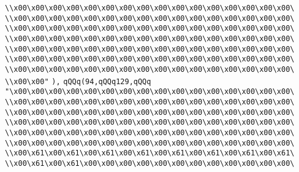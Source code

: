 \verb|\\x00\x00\x00\x00\x00\x00\x00\x00\x00\x00\x00\x00\x00\x00\x00\x00\|\newline
\verb|\\x00\x00\x00\x00\x00\x00\x00\x00\x00\x00\x00\x00\x00\x00\x00\x00\|\newline
\verb|\\x00\x00\x00\x00\x00\x00\x00\x00\x00\x00\x00\x00\x00\x00\x00\x00\|\newline
\verb|\\x00\x00\x00\x00\x00\x00\x00\x00\x00\x00\x00\x00\x00\x00\x00\x00\|\newline
\verb|\\x00\x00\x00\x00\x00\x00\x00\x00\x00\x00\x00\x00\x00\x00\x00\x00\|\newline
\verb|\\x00\x00\x00\x00\x00\x00\x00\x00\x00\x00\x00\x00\x00\x00\x00\x00\|\newline
\verb|\\x00\x00\x00\x00\x00\x00\x00\x00\x00\x00\x00\x00\x00\x00\x00\x00\|\newline
\verb|\\x00\x00"|\newline
\verb|),|\newline
\verb|qQQq(94,qQQq129,qQQq|\newline
\verb|"\x00\x00\x00\x00\x00\x00\x00\x00\x00\x00\x00\x00\x00\x00\x00\x00\|\newline
\verb|\\x00\x00\x00\x00\x00\x00\x00\x00\x00\x00\x00\x00\x00\x00\x00\x00\|\newline
\verb|\\x00\x00\x00\x00\x00\x00\x00\x00\x00\x00\x00\x00\x00\x00\x00\x00\|\newline
\verb|\\x00\x00\x00\x00\x00\x00\x00\x00\x00\x00\x00\x00\x00\x00\x00\x00\|\newline
\verb|\\x00\x00\x00\x00\x00\x00\x00\x00\x00\x00\x00\x00\x00\x00\x00\x00\|\newline
\verb|\\x00\x00\x00\x00\x00\x00\x00\x00\x00\x00\x00\x00\x00\x00\x00\x00\|\newline
\verb|\\x00\x61\x00\x61\x00\x61\x00\x61\x00\x61\x00\x61\x00\x61\x00\x61\|\newline
\verb|\\x00\x61\x00\x61\x00\x00\x00\x00\x00\x00\x00\x00\x00\x00\x00\x00\|\newline
